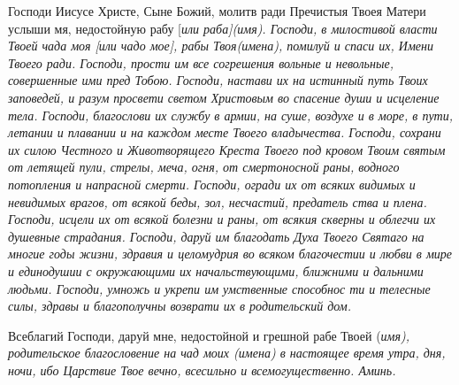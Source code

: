  


Господи Иисусе Христе, Сыне Божий, молитв ради Пречистыя Твоея Матери услыши мя, недостойную рабу [\itshape или\normalfont{} раба]\itshape  (имя).\normalfont{} Господи, в милостивой власти Твоей чада моя [\itshape или\normalfont{} чадо мое], рабы Твоя\itshape  (имена),\normalfont{} помилуй и спаси их, Имени Твоего ради. Господи, прости им все согрешения вольные и невольные, совершенные ими пред Тобою. Господи, настави их на истинный путь Твоих заповедей, и разум просвети светом Христовым во спасение души и исцеление тела. Господи, благослови их службу в армии, на суше, воздухе и в море, в пути, летании и плавании и на каждом месте Твоего владычества. Господи, сохрани их силою Честного и Животворящего Креста Твоего под кровом Твоим святым от летящей пули, стрелы, меча, огня, от смертоносной раны, водного потопления и напрасной смерти. Господи, огради их от всяких видимых и невидимых врагов, от всякой беды, зол, несчастий, предатель ства и плена. Господи, исцели их от всякой болезни и раны, от всякия скверны и облегчи их душевные страдания. Господи, даруй им благодать Духа Твоего Святаго на многие годы жизни, здравия и целомудрия во всяком благочестии и любви в мире и единодушии с окружающими их начальствующими, ближними и дальними людьми. Господи, умножь и укрепи им умственные способнос ти и телесные силы, здравы и благополучны возврати их в родительский дом. 

Всеблагий  Господи, даруй мне, недостойной и грешной рабе Твоей (\itshape имя\normalfont{}), родительское благословение на чад моих (\itshape имена\normalfont{}) в настоящее время утра, дня, ночи, ибо Царствие Твое вечно, всесильно и всемогущественно. Аминь. 



\mychapterending
